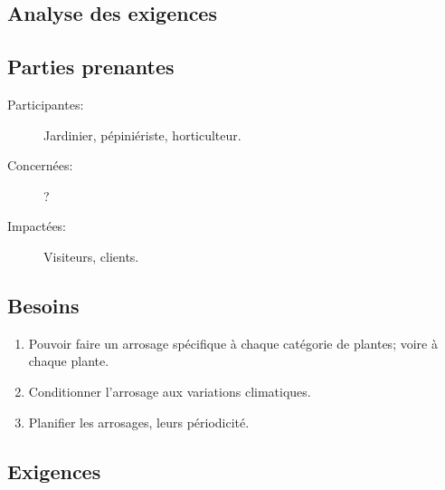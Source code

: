 \textcolor[RGB]{46, 116, 181}{\chapter{Analyse des exigences}}
\section{Parties prenantes}
\begin{description}
\item[Participantes:] Jardinier, pépiniériste, horticulteur.
\item[Concernées:] ?
\item[Impactées:] Visiteurs, clients.
\end{description}

\section{Besoins}
\begin{enumerate}
\item Pouvoir faire un arrosage spécifique à chaque catégorie de plantes; voire à chaque plante.
\item Conditionner l'arrosage aux variations climatiques.
\item Planifier les arrosages, leurs périodicité.
\end{enumerate}

\section{Exigences}

